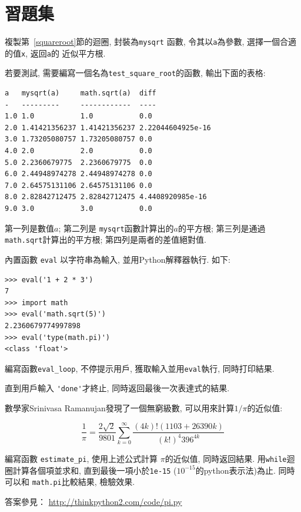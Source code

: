 \documentclass[10pt]{book}
\begin{document}
\section{習題集}

\begin{exercise}

複製第~\ref{squareroot}節的迴圈, 封裝為\verb"mysqrt" 函數, 
令其以{\tt a}為參數, 選擇一個合適的值{\tt x}, 返回{\tt a}的
近似平方根.  

若要測試, 需要編寫一個名為\verb"test_square_root"的函數, 
輸出下面的表格:

\begin{verbatim}
a   mysqrt(a)     math.sqrt(a)  diff
-   ---------     ------------  ----
1.0 1.0           1.0           0.0
2.0 1.41421356237 1.41421356237 2.22044604925e-16
3.0 1.73205080757 1.73205080757 0.0
4.0 2.0           2.0           0.0
5.0 2.2360679775  2.2360679775  0.0
6.0 2.44948974278 2.44948974278 0.0
7.0 2.64575131106 2.64575131106 0.0
8.0 2.82842712475 2.82842712475 4.4408920985e-16
9.0 3.0           3.0           0.0
\end{verbatim}
%
第一列是數值$a$; 第二列是 \verb"mysqrt"函數計算出的$a$的平方根;
第三列是通過{\tt math.sqrt}計算出的平方根;
第四列是兩者的差值絕對值. 
\end{exercise}


\begin{exercise}
內置函數 {\tt eval} 以字符串為輸入, 並用Python解釋器執行. 
如下:

\begin{verbatim}
>>> eval('1 + 2 * 3')
7
>>> import math
>>> eval('math.sqrt(5)')
2.2360679774997898
>>> eval('type(math.pi)')
<class 'float'>
\end{verbatim}
%
編寫函數\verb"eval_loop", 不停提示用戶, 獲取輸入並用{\tt eval}執行, 
同時打印結果. 

直到用戶輸入 \verb"'done'"才終止, 
同時返回最後一次表達式的結果. 

\end{exercise}


\begin{exercise}
數學家Srinivasa Ramanujan發現了一個無窮級數, 
可以用來計算$1 / \pi$的近似值:

\[ \frac{1}{\pi} = \frac{2\sqrt{2}}{9801} 
\sum^\infty_{k=0} \frac{(4k)!(1103+26390k)}{(k!)^4 396^{4k}} \]

編寫函數 \verb"estimate_pi", 使用上述公式計算 $\pi$的近似值, 
同時返回結果. 用{\tt while}迴圈計算各個項並求和, 直到最後一項小於{\tt 1e-15}
($10^{-15}$的python表示法)為止. 
同時可以和 {\tt math.pi}比較結果, 檢驗效果. 

答案參見： \url{http://thinkpython2.com/code/pi.py}

\end{exercise}
\end{document}
